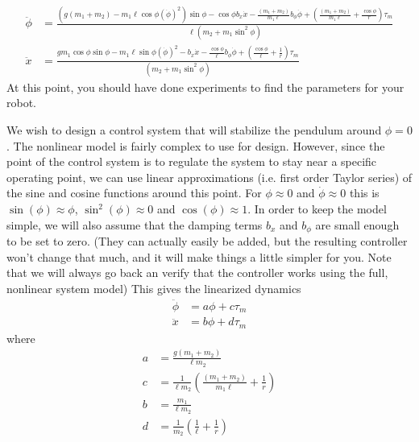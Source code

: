 \begin{equation}\label{eqn:model}
\begin{aligned}
\ddot{\phi}&= \frac{(g(m_{1}+m_{2})-m_{1}\ell\cos\phi(\dot{\phi})^2) \sin\phi -  \cos{\phi}b_{x}\dot{x}   -  \frac{(m_{1}+m_{2})}{m_{1}\ell}b_{\phi}\dot{\phi}  + \left( \frac{(m_{1}+m_{2})}{m_{1}\ell}+ \frac{\cos{\phi}}{r}\right)\tau_{m}}{\ell\left(m_{2} +m_{1}\sin^{2}\phi\right)} \\
\ddot{x} &= \frac{gm_{1}\cos\phi\sin\phi - m_{1}\ell\sin\phi(\dot{\phi})^2 -b_{x}\dot{x} - \frac{\cos\phi}{\ell}b_{\phi}\dot{\phi} +\left( \frac{\cos\phi}{\ell} + \frac{1}{r} \right)\tau_{m}}{(m_{2} + m_{1}\sin^2\phi)}
\end{aligned}
\end{equation}
At this point, you should have done experiments to find the parameters for your robot.


We wish to design a control system that will stabilize the pendulum around $\phi=0$. The nonlinear model is fairly complex to use for design. However, since the point of the control system is to regulate the system to stay near a specific operating point, we can use linear approximations (i.e. first order Taylor series) of the sine and cosine functions around this point. For $\phi\approx 0$ and $\dot{\phi}\approx 0$ this is $\sin(\phi)\approx\phi$, $\sin^2(\phi)\approx 0$ and $\cos(\phi)\approx 1$. In order to keep the model simple, we will also assume that the damping terms $b_{x}$ and $b_{\phi}$ are small enough to be set to zero. (They can actually easily be added, but the resulting controller won't change that much, and it will make things a little simpler for you. Note that we will always go back an verify that the controller works using the full, nonlinear system model)  This gives the linearized dynamics
\begin{align*}
\ddot{\phi} &= a \phi + c \tau_{m} \\
\ddot{x} &=  b\phi + d \tau_{m} 
\end{align*}
where
\begin{align*}
a &= \frac{g(m_{1}+m_{2})}{\ell m_{2}}\\
c & = \frac{1}{\ell m_{2}}\left( \frac{(m_{1}+m_{2})}{m_{1}\ell}+ \frac{1}{r}\right) \\
b &= \frac{m_{1}}{\ell m_{2}}\\
d & = \frac{1}{m_{2}}\left( \frac{1}{\ell}+ \frac{1}{r}\right)
\end{align*}

